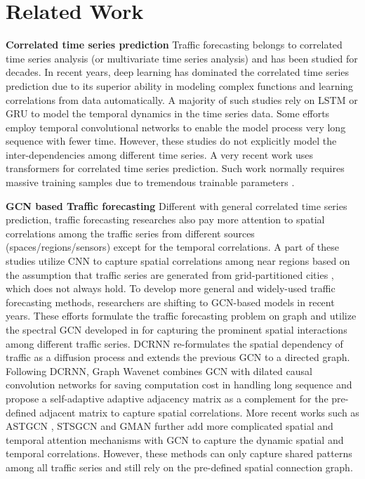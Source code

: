 \documentclass{article}
\begin{document}
\section{Related Work}
\textbf{Correlated time series prediction} Traffic forecasting belongs to correlated time series analysis (or multivariate time series analysis) and has been studied for decades. In recent years, deep learning has dominated the correlated time series prediction due to its superior ability in modeling complex functions and learning correlations from data automatically. A majority of such studies \cite{can2020cikm,vrnn-2015nips,deepar-2019,xianfeng-aaai2020,imputation-nips2018,deepstate-2018nips,brits-nips2018,lstnet} rely on LSTM or GRU to model the temporal dynamics in the time series data.
Some efforts employ temporal convolutional networks \cite{convtimeseries-2017,convtimeseries-2018,tconv-nips2019} to enable the model process very long sequence with fewer time. However, these studies do not explicitly model the inter-dependencies among different time series.
A very recent work \cite{sttransformer-2020} uses transformers for correlated time series prediction. Such work normally requires massive training samples due to tremendous trainable parameters \cite{transformer-timeseries2019}.

\textbf{GCN based Traffic forecasting} Different with general correlated time series prediction, traffic forecasting researches also pay more attention to spatial correlations among the traffic series from different sources (spaces/regions/sensors) except for the temporal correlations. A part of these studies \cite{deepst,resstnet,lei-pakdd2019,dmvst} utilize CNN to capture spatial correlations among near regions based on the assumption that traffic series are generated from grid-partitioned cities \cite{resstnet}, which does not always hold. To develop more general and widely-used traffic forecasting methods, researchers are shifting to GCN-based models in recent years. These efforts \cite{stgcn,lei-ijcai2019,lei2019cikm,graphwavenet,astgcn,stsgcn-aaai2020,multigraph-aaai2019,gcn-traffic-survey,traffic-survey} formulate the traffic forecasting problem on graph and utilize the spectral GCN developed in \cite{gcn-defferrard,kipf-gcn} for capturing the prominent spatial interactions among different traffic series. DCRNN \cite{DCRNN} re-formulates the spatial dependency of traffic as a diffusion process and extends the previous GCN \cite{gcn-defferrard,kipf-gcn} to a directed graph. 
Following DCRNN, Graph Wavenet \cite{graphwavenet} combines GCN with dilated causal convolution networks for saving computation cost in handling long sequence and propose a self-adaptive adaptive adjacency matrix as a complement for the pre-defined adjacent matrix to capture spatial correlations.
More recent works such as ASTGCN \cite{astgcn}, STSGCN \cite{stsgcn-aaai2020} and GMAN \cite{gman-aaai2020} further add more complicated spatial and temporal attention mechanisms with GCN to capture the dynamic spatial and temporal correlations. However, these methods can only capture shared patterns among all traffic series and still rely on the pre-defined spatial connection graph. 
\end{document}
